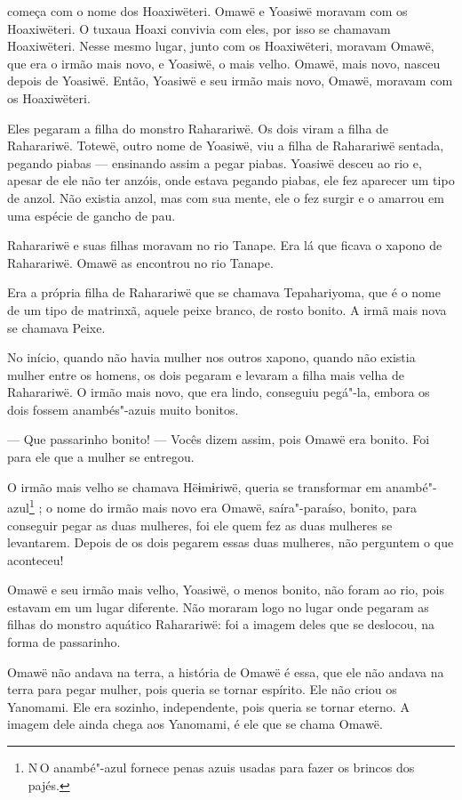  

 

 começa com o nome dos Hoaxiwëteri. Omawë e Yoasiwë moravam
com os Hoaxiwëteri. O tuxaua Hoaxi convivia com eles, por isso se
chamavam Hoaxiwëteri. Nesse mesmo lugar, junto com os Hoaxiwëteri,
moravam Omawë, que era o irmão mais novo, e Yoasiwë, o mais velho.
Omawë, mais novo, nasceu depois de Yoasiwë. Então, Yoasiwë e seu irmão
mais novo, Omawë, moravam com os Hoaxiwëteri.

Eles pegaram a filha do monstro Raharariwë. Os dois viram a filha de
Raharariwë. Totewë, outro nome de Yoasiwë, viu a filha de Raharariwë
sentada, pegando piabas --- ensinando assim a pegar piabas. Yoasiwë
desceu ao rio e, apesar de ele não ter anzóis, onde estava pegando
piabas, ele fez aparecer um tipo de anzol. Não existia anzol, mas com
sua mente, ele o fez surgir e o amarrou em uma espécie de gancho de pau.

Raharariwë e suas filhas moravam no rio Tanape. Era lá que ficava o
xapono de Raharariwë. Omawë as encontrou no rio Tanape. 

Era a própria filha de Raharariwë que se chamava Tepahariyoma, que é o
nome de um tipo de matrinxã, aquele peixe branco, de rosto bonito. A irmã mais nova se chamava Peixe. 

No início, quando não havia mulher nos outros xapono, quando não existia
mulher entre os homens, os dois pegaram e levaram a filha mais velha de
Raharariwë. O irmão mais novo, que era lindo, conseguiu pegá"-la, embora
os dois fossem anambés"-azuis muito bonitos. 

--- Que passarinho bonito! --- Vocês dizem assim, pois Omawë era bonito.
Foi para ele que a mulher se entregou. 

O irmão mais velho se chamava Hëɨmɨriwë, queria se transformar em
anambé"-azul\footnote{  N\,O anambé"-azul fornece penas azuis usadas para fazer os brincos dos
pajés.} ; o nome do irmão mais novo era Omawë,
saíra"-paraíso, bonito, para conseguir pegar as duas mulheres, foi ele
quem fez as duas mulheres se levantarem. Depois de os dois pegarem essas
duas mulheres, não perguntem o que aconteceu! 

Omawë e seu irmão mais velho, Yoasiwë, o menos bonito, não foram ao rio,
pois estavam em um lugar diferente. Não moraram logo no lugar onde
pegaram as filhas do monstro aquático Raharariwë: foi a imagem deles que
se deslocou, na forma de passarinho.

Omawë não andava na terra, a história de Omawë é essa, que ele não
andava na terra para pegar mulher, pois queria se tornar espírito. Ele
não criou os Yanomami. Ele era sozinho, independente, pois queria se
tornar eterno. A imagem dele ainda chega aos Yanomami, é ele que se
chama Omawë.

